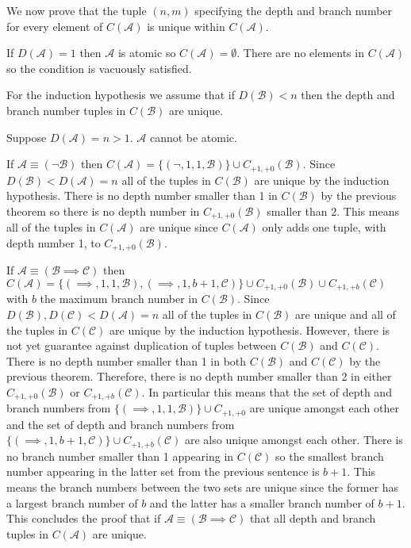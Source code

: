 \documentclass[12pt]{article}
\newcommand{\mc}[1]{\mathcal{#1}}
\begin{document}
We now prove that the tuple $(n, m)$ specifying the depth and branch number for every element of $C(\mc{A})$ is unique within $C(\mc{A})$. 

If $D(\mc{A}) = 1$ then $\mc{A}$ is atomic so $C(\mc{A}) = \emptyset$. There are no elements in $C(\mc{A})$ so the condition is vacuously satisfied.

For the induction hypothesis we assume that if $D(\mc{B}) < n$ then the depth and branch number tuples in $C(\mc{B})$ are unique.

Suppose $D(\mc{A}) = n > 1$. $\mc{A}$ cannot be atomic.

If $\mc{A} \equiv (\lnot \mc{B})$ then $C(\mc{A}) = \{(\lnot, 1, 1, \mc{B})\} \cup C_{+1, +0}(\mc{B})$. Since $D(\mc{B}) < D(\mc{A}) = n$ all of the tuples in $C(\mc{B})$ are unique by the induction hypothesis. There is no depth number smaller than 1 in $C(\mc{B})$ by the previous theorem so there is no depth number in $C_{+1, +0}(\mc{B})$ smaller than 2. This means all of the tuples in $C(\mc{A})$ are unique since $C(\mc{A})$ only adds one tuple, with depth number 1, to $C_{+1, +0}(\mc{B})$.

If $\mc{A} \equiv (\mc{B} \implies \mc{C})$ then $C(\mc{A}) = \{(\implies, 1, 1, \mc{B}), (\implies, 1, b+1, \mc{C})\} \cup C_{+1, +0}(\mc{B}) \cup C_{+1, +b}(\mc{C})$ with $b$ the maximum branch number in $C(\mc{B})$. Since $D(\mc{B}), D(\mc{C}) < D(\mc{A}) = n$ all of the tuples in $C(\mc{B})$ are unique and all of the tuples in $C(\mc{C})$ are unique by the induction hypothesis. However, there is not yet guarantee against duplication of tuples between $C(\mc{B})$ and $C(\mc{C})$. There is no depth number smaller than 1 in both $C(\mc{B})$ and $C(\mc{C})$ by the previous theorem. Therefore, there is no depth number smaller than 2 in either $C_{+1, +0}(\mc{B})$ or $C_{+1, +b}(\mc{C})$. In particular this means that the set of depth and branch numbers from $\{(\implies, 1, 1, \mc{B})\} \cup C_{+1, +0}$ are unique amongst each other and the set of depth and branch numbers from $\{(\implies, 1, b+1, \mc{C})\} \cup C_{+1, +b}(\mc{C})$ are also unique amongst each other. There is no branch number smaller than 1 appearing in $C(\mc{C})$ so the smallest branch number appearing in the latter set from the previous sentence is $b+1$. This means the branch numbers between the two sets are unique since the former has a largest branch number of $b$ and the latter has a smaller branch number of $b+1$. This concludes the proof that if $\mc{A} \equiv (\mc{B} \implies \mc{C})$ that all depth and branch tuples in $C(\mc{A})$ are unique.
\end{document}
